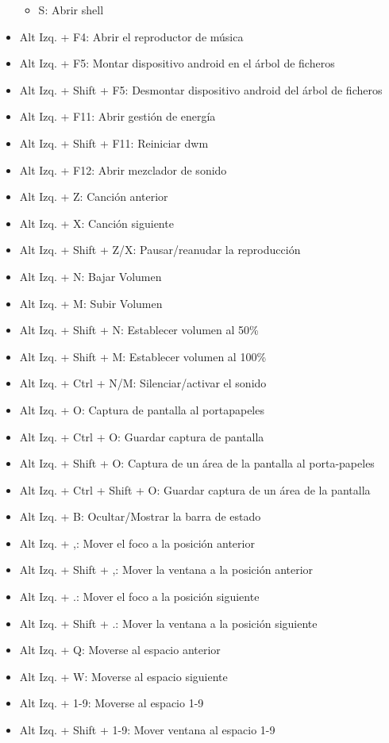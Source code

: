 \documentclass[12pt]{article}
\begin{document}
\begin{itemize}
\begin{itemize}
\item S: Abrir shell
\end{itemize}
\item Alt Izq. + F4: Abrir el reproductor de música
\item Alt Izq. + F5: Montar dispositivo android en el árbol de ficheros
\item Alt Izq. + Shift + F5: Desmontar dispositivo android del árbol de ficheros
\item Alt Izq. + F11: Abrir gestión de energía
\item Alt Izq. + Shift + F11: Reiniciar dwm
\item Alt Izq. + F12: Abrir mezclador de sonido
\item Alt Izq. + Z: Canción anterior
\item Alt Izq. + X: Canción siguiente
\item Alt Izq. + Shift + Z/X: Pausar/reanudar la reproducción
\item Alt Izq. + N: Bajar Volumen
\item Alt Izq. + M: Subir Volumen
\item Alt Izq. + Shift + N: Establecer volumen al 50\%
\item Alt Izq. + Shift + M: Establecer volumen al 100\%
\item Alt Izq. + Ctrl + N/M: Silenciar/activar el sonido
\item Alt Izq. + O: Captura de pantalla al portapapeles
\item Alt Izq. + Ctrl + O: Guardar captura de pantalla
\item Alt Izq. + Shift + O: Captura de un área de la pantalla al porta-papeles
\item Alt Izq. + Ctrl + Shift + O: Guardar captura de un área de la pantalla
\item Alt Izq. + B: Ocultar/Mostrar la barra de estado
\item Alt Izq. + ,: Mover el foco a la posición anterior
\item Alt Izq. + Shift + ,: Mover la ventana a la posición anterior
\item Alt Izq. + .: Mover el foco a la posición siguiente
\item Alt Izq. + Shift + .: Mover la ventana a la posición siguiente
\item Alt Izq. + Q: Moverse al espacio anterior
\item Alt Izq. + W: Moverse al espacio siguiente
\item Alt Izq. + 1-9: Moverse al espacio 1-9
\item Alt Izq. + Shift + 1-9: Mover ventana al espacio 1-9

\end{itemize}
\end{document}
